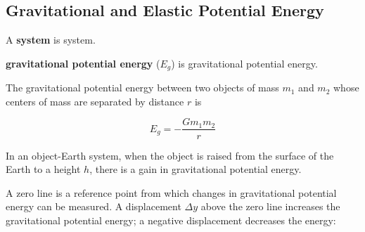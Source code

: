 \documentclass[dvipsnames]{article}
\newif\ifShowUnitVIII
\begin{document}
\ifShowUnitVIII

\subsection{Gravitational and Elastic Potential Energy}

A \textbf{\gls{system}} is \glsdesc{system}.

\textbf{\Gls{gravitational potential energy}} ($E_g$) is \glsdesc{gravitational potential energy}.

The gravitational potential energy between two objects of mass $m_1$ and $m_2$ whose centers of mass are separated by distance $r$ is

\begin{equation*}
    E_g = -\frac{G m_1 m_2}{r}
\end{equation*}

In an object-Earth system, when the object is raised from the surface of the Earth to a height $h$, there is a gain in gravitational potential energy.


\begin{center}
\end{center}

A zero line is a reference point from which changes in gravitational potential energy can be measured. A displacement $\Delta y$ above the zero line increases the gravitational potential energy; a negative displacement decreases the energy:
\end{document}
